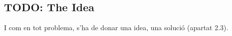 
\subsection{TODO: The Idea}

I com en tot problema, s'ha de donar una idea, una solució (apartat 2.3).
